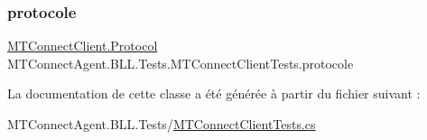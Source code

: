 \mbox{\label{class_m_t_connect_agent_1_1_b_l_l_1_1_tests_1_1_m_t_connect_client_tests_a102f3253321c2caeabab74fbf403309d}} 
\subsubsection{\texorpdfstring{protocole}{protocole}}
{\footnotesize\ttfamily \mbox{\hyperlink{class_m_t_connect_agent_1_1_b_l_l_1_1_m_t_connect_client_a2f390f74a0ad3ee5147e9438ceed6474}{M\+T\+Connect\+Client.\+Protocol}} M\+T\+Connect\+Agent.\+B\+L\+L.\+Tests.\+M\+T\+Connect\+Client\+Tests.\+protocole\hspace{0.3cm}{\ttfamily [private]}}



La documentation de cette classe a été générée à partir du fichier suivant \+:\begin{DoxyCompactItemize}
\item 
M\+T\+Connect\+Agent.\+B\+L\+L.\+Tests/\mbox{\hyperlink{_m_t_connect_client_tests_8cs}{M\+T\+Connect\+Client\+Tests.\+cs}}\end{DoxyCompactItemize}
